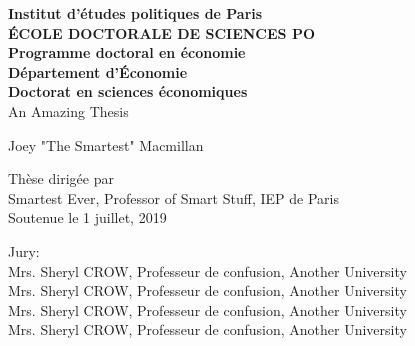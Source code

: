 \begin{titlepage}
\begin{center}
    \vspace*{1cm}

    \Large
    \textbf{Institut d'\'etudes politiques de Paris}\\
    \textbf{\'ECOLE DOCTORALE DE SCIENCES PO}\\
    \textbf{Programme doctoral en \'economie}\\
    \textbf{D\'epartement d'\'Economie}\\
    \textbf{Doctorat en sciences \'economiques}\\

    \vspace{1.5cm}
    \Huge
    An Amazing Thesis


    \vspace{0.5cm}
    \Large
    Joey "The Smartest" Macmillan

    \vfill

    Th\`ese dirig\'ee par\\
     Smartest Ever, Professor of Smart Stuff, IEP de Paris\\
    Soutenue le 1 juillet, 2019

    \vspace{0.8cm}


\large

\centering
\noindent Jury:\\
\hspace{-0.0cm}Mrs. Sheryl CROW, Professeur de confusion, Another University\\
\hspace{-0.0cm}Mrs. Sheryl CROW, Professeur de confusion, Another University\\
\hspace{-0.0cm}Mrs. Sheryl CROW, Professeur de confusion, Another University\\
\hspace{-0.0cm}Mrs. Sheryl CROW, Professeur de confusion, Another University\\
\end{center}
\end{titlepage}

\setcounter{page}{2}
